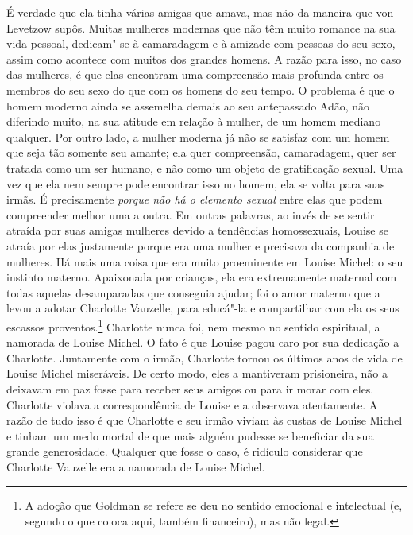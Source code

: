 É verdade que ela tinha várias amigas que amava, mas não da maneira que
von Levetzow supôs. Muitas mulheres modernas que não têm muito romance na
sua vida pessoal, dedicam"-se à camaradagem e à amizade com
pessoas do seu sexo, assim como acontece com muitos dos grandes homens.
A razão para isso, no caso das mulheres, é que elas encontram uma
compreensão mais profunda entre os membros do seu sexo do que
com os homens do seu tempo. O problema é que o homem moderno ainda se
assemelha demais ao seu antepassado Adão, não diferindo muito, na sua
atitude em relação à mulher, de um homem mediano qualquer. Por outro
lado, a mulher moderna já não se satisfaz com um homem que seja tão
somente seu amante; ela quer compreensão, camaradagem, quer ser tratada
como um ser humano, e não como um objeto de gratificação sexual. Uma vez
que ela nem sempre pode encontrar isso no homem, ela se volta para suas
irmãs. É precisamente \emph{porque não há o elemento sexual} entre elas
que podem compreender melhor uma a outra. Em outras palavras, ao
invés de se sentir atraída por suas amigas mulheres devido a
tendências homossexuais, Louise se atraía por elas justamente porque era
uma mulher e precisava da companhia de mulheres. Há mais uma coisa que
era muito proeminente em Louise Michel: o seu instinto materno.
Apaixonada por crianças, ela era extremamente maternal com todas aquelas desamparadas
que conseguia ajudar; foi o amor materno que a levou
a adotar Charlotte Vauzelle, para educá"-la e compartilhar com ela os
seus escassos proventos.\footnote{A adoção que Goldman se refere se deu
  no sentido emocional e intelectual (e, segundo o que coloca aqui,
  também financeiro), mas não legal.} Charlotte nunca foi, nem mesmo no
sentido espiritual, a namorada de Louise Michel. O fato é que Louise
pagou caro por sua dedicação a Charlotte. Juntamente com o irmão,
Charlotte tornou os últimos anos de vida de Louise Michel miseráveis. De
certo modo, eles a mantiveram prisioneira, não a deixavam em paz fosse
para receber seus amigos ou para ir morar com eles. Charlotte violava a
correspondência de Louise e a observava atentamente. A razão de tudo
isso é que Charlotte e seu irmão viviam às custas de Louise Michel e
tinham um medo mortal de que mais alguém pudesse se beneficiar da sua
grande generosidade. Qualquer que fosse o caso, é ridículo considerar
que Charlotte Vauzelle era a namorada de Louise Michel.

